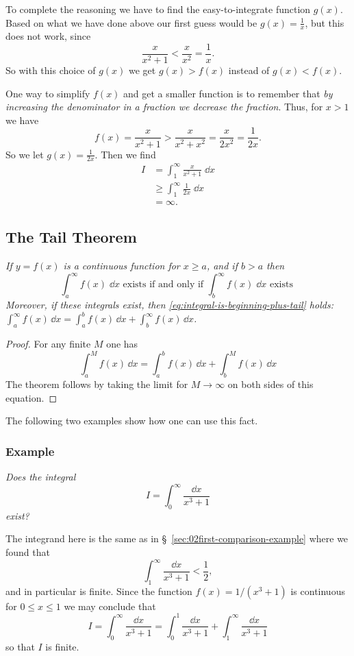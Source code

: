 To complete the reasoning we have to find the easy-to-integrate
function $g(x)$.  Based on what we have done above our first guess
would be $g(x) = \frac{1} {x}$, but this does not work, since
\[
\frac{x} {x^2+1} < \frac{x} {x^2} = \frac{1} {x}.
\]
So with this choice of $g(x)$ we get $g(x)>f(x)$ instead of
$g(x)<f(x)$.

One way to simplify $f(x)$ and get a smaller function is to remember
that \textit{by increasing the denominator in a fraction we decrease
  the fraction}.  Thus, for $x>1$ we have
\[
f(x) = \frac{x} {x^2+1} > \frac{x} {x^2 + x^2} = \frac{x} {2x^2} =
\frac{1} {2x}.
\]
So we let $g(x) = \frac{1} {2x}$.  Then we find
\begin{align*}
  I
  &= \int _1^\infty \frac{x} {x^2+1} \;\dd x\\
  &\geq \int _1^\infty \frac{1} {2x} \;\dd x\\
  & = \infty.
\end{align*}


\subsection{The Tail Theorem}\label{thm:tail-of-integral}\itshape%
If $y=f(x)$ is a continuous function for $x\geq a$, and if $b>a$ then
\[
\int_a^\infty f(x) \;\dd x \text{ exists if and only if }
\int_b^\infty f(x) \;\dd x \text{ exists }
\]
Moreover, if these integrals exist, then
\eqref{eq:integral-is-beginning-plus-tail} holds: $\int_a^\infty
f(x)\,\dd x = \int_a^b f(x)\,\dd x + \int_b^\infty f(x)\,\dd
x$.\upshape

\medskip
\begin{proof}
  For any finite $M$ one has
  \[
  \int_a^M f(x)\,\dd x = \int_a^b f(x)\,\dd x + \int_b^M f(x)\,\dd x
  \]
  The theorem follows by taking the limit for $M\to\infty$ on both
  sides of this equation.
\end{proof}

The following two examples show how one can use this fact.

\subsubsection{Example}
\itshape%
Does the integral
\[
I = \int_0^\infty \frac{\dd x} {x^3+1}
\]
exist?\upshape

The integrand here is the same as in \S~\ref{sec:02first-comparison-example}
where we found that
\[
\int_1^\infty \frac{\dd x} {x^3+1} < \frac12,
\]
and in particular is finite.  Since the function $f(x) = 1/(x^3+1)$ is
continuous for $0\leq x\leq 1$ we may conclude that
\[
I = \int_0^\infty \frac{\dd x} {x^3+1}
=
\int_0^1 \frac{\dd x} {x^3+1} +
\int_1^\infty \frac{\dd x} {x^3+1}
\]
so that $I$ is finite.

